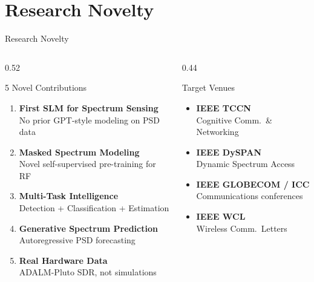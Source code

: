 \documentclass[aspectratio=169, 10pt]{beamer}
\begin{document}
\section{Research Novelty}
\begin{frame}{Research Novelty}
\small
\begin{columns}[T]
\begin{column}{0.52\textwidth}
\begin{block}{5 Novel Contributions}
\footnotesize
\begin{enumerate}
  \item \textbf{First SLM for Spectrum Sensing}\\
    {\scriptsize No prior GPT-style modeling on PSD data}
  \item \textbf{Masked Spectrum Modeling}\\
    {\scriptsize Novel self-supervised pre-training for RF}
  \item \textbf{Multi-Task Intelligence}\\
    {\scriptsize Detection + Classification + Estimation}
  \item \textbf{Generative Spectrum Prediction}\\
    {\scriptsize Autoregressive PSD forecasting}
  \item \textbf{Real Hardware Data}\\
    {\scriptsize ADALM-Pluto SDR, not simulations}
\end{enumerate}
\end{block}
\end{column}

\begin{column}{0.44\textwidth}
\begin{exampleblock}{Target Venues}
\footnotesize
\begin{itemize}
  \item \textbf{IEEE TCCN}\\[-2pt]
    {\scriptsize Cognitive Comm.\ \& Networking}
  \item \textbf{IEEE DySPAN}\\[-2pt]
    {\scriptsize Dynamic Spectrum Access}
  \item \textbf{IEEE GLOBECOM / ICC}\\[-2pt]
    {\scriptsize Communications conferences}
  \item \textbf{IEEE WCL}\\[-2pt]
    {\scriptsize Wireless Comm.\ Letters}
\end{itemize}
\end{exampleblock}
\end{column}
\end{columns}
\end{frame}
\end{document}
